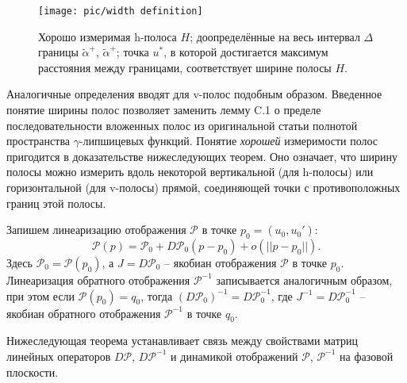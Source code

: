 \documentclass{article}
\begin{document}
\begin{figure}[h]
\centering
  \texttt{[image: pic/width definition]}
  \caption{Хорошо измеримая h-полоса $H$; доопределённые на весь интервал $\Delta$ границы $\widetilde{\alpha}^+$, $\widetilde{\alpha}^+$; точка $u^*$, в которой достигается максимум расстояния между границами, соответствует ширине полосы $H$.}
\label{fig:width-definition}
\end{figure}

Аналогичные определения вводят для v-полос подобным образом.
Введенное понятие ширины полос позволяет заменить лемму C.1 о пределе последовательности вложенных полос из оригинальной статьи \cite{ref:alfimov-avramenko-2013} полнотой пространства $\gamma$-липшицевых функций.
Понятие {\it хорошей} измеримости полос пригодится в доказательстве  нижеследующих теорем.
Оно означает, что ширину полосы можно измерить вдоль некоторой вертикальной (для h-полосы) или горизонтальной (для v-полосы) прямой, соединяющей точки с противоположных границ этой полосы.

Запишем линеаризацию отображения $\mathcal{P}$ в точке $p_0 = (u_0, u_0')$:
\begin{equation}
	\mathcal{P}(p) = \mathcal{P}_0 + D \mathcal{P}_0 (p - p_0) + o(||p - p_0||).
\label{eq:diff}
\end{equation}
Здесь $\mathcal{P}_0 = \mathcal{P}(p_0)$, а $J = D \mathcal{P}_0$ -- якобиан отображения $\mathcal{P}$ в точке $p_0$.
Линеаризация обратного отображения $\mathcal{P}^{-1}$ записывается аналогичным образом, при этом если $\mathcal{P}(p_0) = q_0$, тогда $(D \mathcal{P}_0)^{-1} = D \mathcal{P}_0^{-1}$, где $J^{-1} = D \mathcal{P}_0^{-1}$ -- якобиан обратного отображения $\mathcal{P}^{-1}$ в точке $q_0$.

Нижеследующая теорема устанавливает связь между свойствами матриц линейных операторов $D \mathcal{P}$, $D \mathcal{P}^{-1}$ и динамикой отображений $\mathcal{P}$, $\mathcal{P}^{-1}$ на фазовой плоскости.
\end{document}
